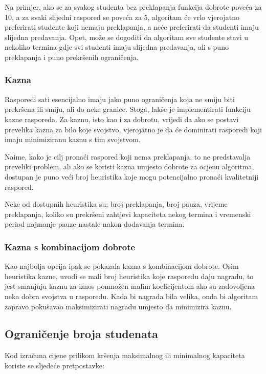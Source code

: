 \documentclass[times, utf8, zavrsni]{fer}
\begin{document}
Na primjer, ako se za svakog studenta bez preklapanja funkcija dobrote poveća za 10, a za svaki slijedni raspored se poveća za 5, algoritam će vrlo vjerojatno preferirati studente koji nemaju preklapanja, a neće preferirati da studenti imaju slijedna predavanja. Opet, može se dogoditi da algoritam sve studente stavi u nekoliko termina gdje svi studenti imaju slijedna predavanja, ali s puno preklapanja i puno prekršenih ograničenja.

\subsubsection{Kazna}

Rasporedi sati esencijalno imaju jako puno ograničenja koja ne smiju biti prekršena ili smiju, ali do neke granice. Stoga, lakše je implementirati funkciju kazne rasporeda. Za kaznu, isto kao i za dobrotu, vrijedi da ako se postavi prevelika kazna za bilo koje svojstvo, vjerojatno je da će dominirati rasporedi koji imaju minimiziranu kaznu s tim svojstvom.

Naime, kako je cilj pronaći raspored koji nema preklapanja, to ne predstavalja preveliki problem, ali ako se koristi kazna umjesto dobrote za ocjenu algoritma, dostupan je puno veći broj heuristika koje mogu potencijalno pronaći kvalitetniji raspored.

Neke od dostupnih heuristika su: broj preklapanja, broj pauza, vrijeme preklapanja, koliko su prekršeni zahtjevi kapaciteta nekog termina i vremenski period najmanje pauze nastale nakon dodavanja termina.

\subsubsection{Kazna s kombinacijom dobrote}
\label{sec:kombinacija}

Kao najbolja opcija ipak se pokazala kazna s kombinacijom dobrote. Osim heuristika kazne, uvodi se mali broj heuristika koje rasporedu daju nagradu, to jest smanjuju kaznu za iznos pomnožen malim koeficijentom ako su zadovoljena neka dobra svojstva u rasporedu. Kada bi nagrada bila velika, onda bi algoritam zapravo pokušavao maksimizirati nagradu umjesto da minimizira kaznu.

\subsection{Ograničenje broja studenata}

Kod izračuna cijene prilikom kršenja maksimalnog ili minimalnog kapaciteta koriste se sljedeće pretpostavke:
\end{document}
